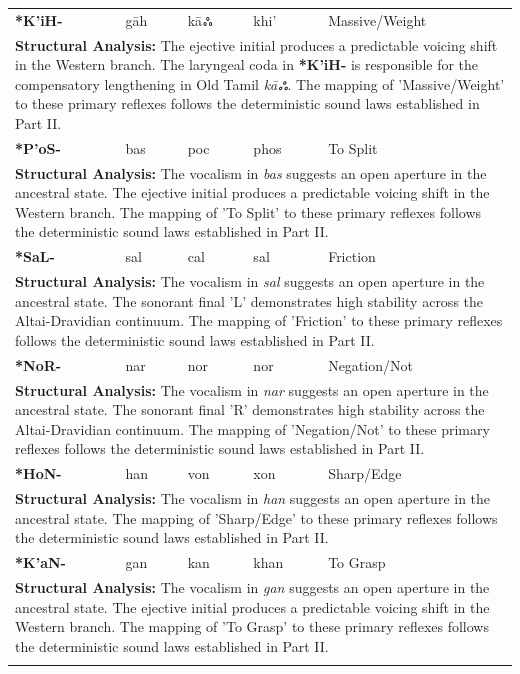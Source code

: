 \begin{longtable}{p{} p{} p{} p{} p{}}
\textbf{*K'iH-} & gāh & kāஃ & khi' & Massive/Weight \\ 
\multicolumn{5}{p{\textwidth}}{\small \textbf{Structural Analysis:} The ejective initial produces a predictable voicing shift in the Western branch. The laryngeal coda in \textbf{*K'iH-} is responsible for the compensatory lengthening in Old Tamil \textit{kāஃ}. The mapping of 'Massive/Weight' to these primary reflexes follows the deterministic sound laws established in Part II.} \\ \addlinespace[15pt] 
\textbf{*P'oS-} & bas & poc & phos & To Split \\ 
\multicolumn{5}{p{\textwidth}}{\small \textbf{Structural Analysis:} The vocalism in \textit{bas} suggests an open aperture in the ancestral state. The ejective initial produces a predictable voicing shift in the Western branch. The mapping of 'To Split' to these primary reflexes follows the deterministic sound laws established in Part II.} \\ \addlinespace[15pt] 
\textbf{*SaL-} & sal & cal & sal & Friction \\ 
\multicolumn{5}{p{\textwidth}}{\small \textbf{Structural Analysis:} The vocalism in \textit{sal} suggests an open aperture in the ancestral state. The sonorant final 'L' demonstrates high stability across the Altai-Dravidian continuum. The mapping of 'Friction' to these primary reflexes follows the deterministic sound laws established in Part II.} \\ \addlinespace[15pt] 
\textbf{*NoR-} & nar & nor & nor & Negation/Not \\ 
\multicolumn{5}{p{\textwidth}}{\small \textbf{Structural Analysis:} The vocalism in \textit{nar} suggests an open aperture in the ancestral state. The sonorant final 'R' demonstrates high stability across the Altai-Dravidian continuum. The mapping of 'Negation/Not' to these primary reflexes follows the deterministic sound laws established in Part II.} \\ \addlinespace[15pt] 
\textbf{*HoN-} & han & von & xon & Sharp/Edge \\ 
\multicolumn{5}{p{\textwidth}}{\small \textbf{Structural Analysis:} The vocalism in \textit{han} suggests an open aperture in the ancestral state. The mapping of 'Sharp/Edge' to these primary reflexes follows the deterministic sound laws established in Part II.} \\ \addlinespace[15pt] 
\textbf{*K'aN-} & gan & kan & khan & To Grasp \\ 
\multicolumn{5}{p{\textwidth}}{\small \textbf{Structural Analysis:} The vocalism in \textit{gan} suggests an open aperture in the ancestral state. The ejective initial produces a predictable voicing shift in the Western branch. The mapping of 'To Grasp' to these primary reflexes follows the deterministic sound laws established in Part II.} \\ \addlinespace[15pt] 

\end{longtable}
